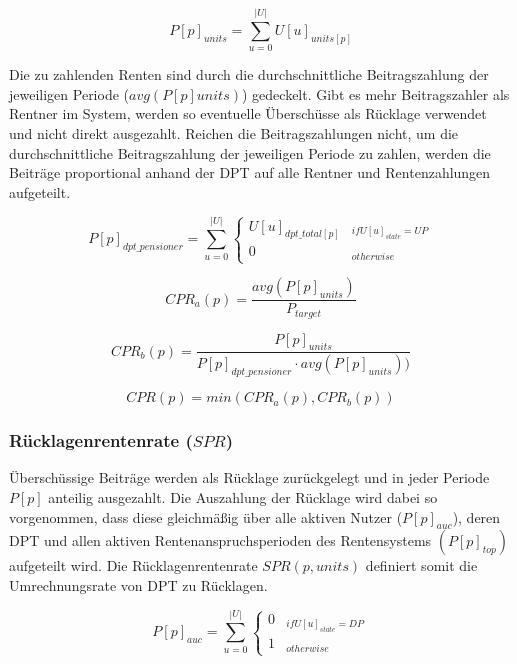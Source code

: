 \begin{equation}
P[p]_{units} = \sum_{u=0}^{|U|} U[u]_{units[p]}
\end{equation}

Die zu zahlenden Renten sind durch die durchschnittliche Beitragszahlung der 
jeweiligen Periode ($avg(P[p]units)$) gedeckelt. Gibt es mehr Beitragszahler als Rentner im System, werden so eventuelle Überschüsse als Rücklage verwendet und nicht direkt ausgezahlt. Reichen die Beitragszahlungen nicht, um die durchschnittliche Beitragszahlung der 
jeweiligen Periode zu zahlen, werden die Beiträge proportional anhand der DPT auf alle Rentner und Rentenzahlungen  aufgeteilt.

\begin{dmath}
P[p]_{dpt\_pensioner} = 
\sum_{u=0}^{|U|} \begin{cases} 
U[u]_{dpt\_total[p]} & _{if U[u]_{state} = UP}\\
0 & _{otherwise}
\end{cases}
\end{dmath}

\begin{equation*}
CPR_{a}(p) = \frac{avg(P[p]_{units})}{P_{target}}
\end{equation*}

\begin{equation*}
CPR_{b}(p) = \frac{P[p]_{units}} {P[p]_{dpt\_pensioner} \cdot avg(P[p]_{units}))}
\end{equation*}

\begin{equation}
CPR(p) = min(CPR_{a}(p), CPR_{b}(p))
\end{equation}


\subsubsection{Rücklagenrentenrate ($SPR$)}

Überschüssige Beiträge werden als Rücklage zurückgelegt und in jeder Periode $P[p]$ anteilig ausgezahlt. Die Auszahlung der Rücklage wird dabei so vorgenommen, dass diese gleichmäßig über alle aktiven Nutzer  ($P[p]_{auc}$), deren DPT und allen aktiven Rentenanspruchsperioden des Rentensystems $(P[p]_{top})$ aufgeteilt wird. Die Rücklagenrentenrate $SPR(p, units)$ definiert somit die Umrechnungsrate von DPT zu Rücklagen.


\begin{equation}
P[p]_{auc} = \sum_{u=0}^{|U|} \begin{cases} 
0 & _{if U[u]_{state} = DP}\\
1 & _{otherwise}
\end{cases}
\end{equation}

